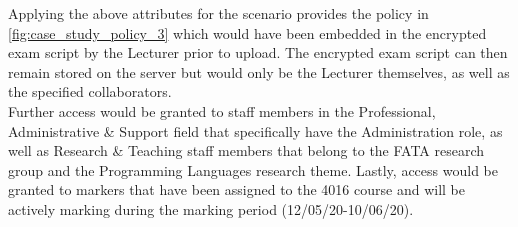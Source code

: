 Applying the above attributes for the scenario provides the policy in \cref{fig:case_study_policy_3} which would have been embedded in the encrypted exam script by the Lecturer prior to upload. The encrypted exam script can then remain stored on the server but would only be the Lecturer themselves, as well as the specified collaborators.\\
Further access would be granted to staff members in the Professional, Administrative \& Support field that specifically have the Administration role, as well as Research \& Teaching staff members that belong to the FATA research group and the Programming Languages research theme. Lastly, access would be granted to markers that have been assigned to the 4016 course and will be actively marking during the marking period (12/05/20-10/06/20).

